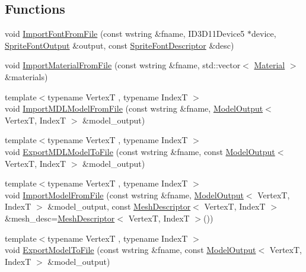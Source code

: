 \subsection*{Functions}
\begin{DoxyCompactItemize}
\item 
void \hyperlink{namespacemage_1_1loader_ae5579c5fc687453dccc6bb42c674c9c5}{Import\+Font\+From\+File} (const wstring \&fname, I\+D3\+D11\+Device5 $\ast$device, \hyperlink{structmage_1_1_sprite_font_output}{Sprite\+Font\+Output} \&output, const \hyperlink{structmage_1_1_sprite_font_descriptor}{Sprite\+Font\+Descriptor} \&desc)
\item 
void \hyperlink{namespacemage_1_1loader_a6480b98de664762f479c876316c27237}{Import\+Material\+From\+File} (const wstring \&fname, std\+::vector$<$ \hyperlink{classmage_1_1_material}{Material} $>$ \&materials)
\item 
{\footnotesize template$<$typename VertexT , typename IndexT $>$ }\\void \hyperlink{namespacemage_1_1loader_a1f890e5991b10a52af358e98b5683ac0}{Import\+M\+D\+L\+Model\+From\+File} (const wstring \&fname, \hyperlink{structmage_1_1_model_output}{Model\+Output}$<$ VertexT, IndexT $>$ \&model\+\_\+output)
\item 
{\footnotesize template$<$typename VertexT , typename IndexT $>$ }\\void \hyperlink{namespacemage_1_1loader_a64249527314ae6207156ee7557ffde79}{Export\+M\+D\+L\+Model\+To\+File} (const wstring \&fname, const \hyperlink{structmage_1_1_model_output}{Model\+Output}$<$ VertexT, IndexT $>$ \&model\+\_\+output)
\item 
{\footnotesize template$<$typename VertexT , typename IndexT $>$ }\\void \hyperlink{namespacemage_1_1loader_aeb9b5b96f23cbe5cbc0e1b0de5b5524a}{Import\+Model\+From\+File} (const wstring \&fname, \hyperlink{structmage_1_1_model_output}{Model\+Output}$<$ VertexT, IndexT $>$ \&model\+\_\+output, const \hyperlink{structmage_1_1_mesh_descriptor}{Mesh\+Descriptor}$<$ VertexT, IndexT $>$ \&mesh\+\_\+desc=\hyperlink{structmage_1_1_mesh_descriptor}{Mesh\+Descriptor}$<$ VertexT, IndexT $>$())
\item 
{\footnotesize template$<$typename VertexT , typename IndexT $>$ }\\void \hyperlink{namespacemage_1_1loader_af341a0ce202e2504cd577f4a97a99bf5}{Export\+Model\+To\+File} (const wstring \&fname, const \hyperlink{structmage_1_1_model_output}{Model\+Output}$<$ VertexT, IndexT $>$ \&model\+\_\+output)

\end{DoxyCompactItemize}
